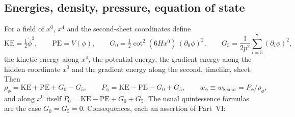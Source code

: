 \documentclass[11pt,a4paper]{article}
\begin{document}
\subsection{Energies, density, pressure, equation of state}

For a field of $x^0$, $x^4$ and the second-sheet coordinates define
\begin{equation}\label{eq:energies}
  \mathrm{KE}=\tfrac12\dot\phi^2,\qquad \mathrm{PE}=V(\phi),\qquad
  G_0=\tfrac12\cot^2(6Hx^0)\,(\partial_0\phi)^2,\qquad
  G_5=\frac{1}{2p^2}\sum_{i=5}^{7}(\partial_i\phi)^2,
\end{equation}
the kinetic energy along $x^4$, the potential energy, the gradient energy along the hidden
coordinate $x^0$ and the gradient energy along the second, timelike, sheet. Then
\begin{equation}\label{eq:rhoPphi}
  \rho_\phi=\mathrm{KE}+\mathrm{PE}+G_0-G_5,\qquad
  P_\phi=\mathrm{KE}-\mathrm{PE}-G_0+G_5,\qquad
  w_\phi\equiv w_{\mathrm{Scalar}}=P_\phi/\rho_\phi ,
\end{equation}
and along $x^0$ itself $P_0=\mathrm{KE}-\mathrm{PE}+G_0+G_5$. The usual quintessence formulas are
the case $G_0=G_5=0$. Consequences, each an assertion of Part~VI:
\end{document}
